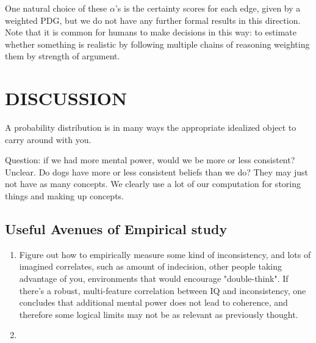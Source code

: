 \documentclass{article}
\newcommand\MaxEnt{_{\mathbf H}}
\newcommand{\MN}{PDG}
\numberwithin{equation}{section}
\begin{document}
\begin{notfocus}
	One natural choice of these $\alpha$'s is the certainty scores for each edge, given by a weighted \MN, but we do not have any further formal results in this direction.
	Note that it is common for humans to make decisions in this way: to estimate whether something is realistic by following multiple chains of reasoning weighting them by strength of argument.
	
	





	\section{DISCUSSION}
	
	
	A probability distribution is in many ways the appropriate idealized object to carry around with you.
	
	Question: if we had more mental power, would we be more or less consistent? Unclear. Do dogs have more or less consistent beliefs than we do? They may just not have as many concepts. We clearly use a lot of our computation for storing things and making up concepts.
	
	

	
	\begin{vfull}
	\subsection{Useful Avenues of Empirical study}
	
	\begin{enumerate}
		\item Figure out how to empirically measure some kind of inconsistency, and lots of imagined correlates, such as amount of indecision, other people taking advantage of you, environments that would encourage "double-think". If there's a robust, multi-feature correlation between IQ and inconsistency, one concludes that additional mental power does not lead to coherence, and therefore some logical limits may not be as relevant as previously thought.
		\item 
	\end{enumerate}
	\end{vfull}
	

\end{notfocus}
\end{document}

